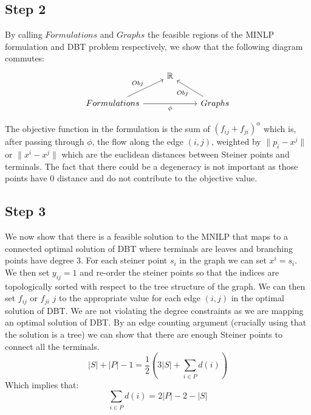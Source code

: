 \documentclass[11pt,reqno,a4paper]{amsart}
\numberwithin{equation}{section}
\theoremstyle{mytheorem}
\theoremstyle{myremark}
\theoremstyle{myparagraph}
\begin{document}
    \subsection{Step 2}
    By calling $Formulations$ and $Graphs$ the feasible regions of the MINLP formulation and DBT problem respectively, we show that the following diagram commutes:
    \[
        \begin{tikzcd}
            & \mathbb{R}  \\
            Formulations \arrow[ur, "Obj"] \arrow[rr, "\phi"'] & & Graphs  \arrow[ul, "Obj"]
        \end{tikzcd}
    \]

    The objective function in the formulation is the sum of $(f_{ij} + f_{ji})^\alpha$ which is, after passing through $\phi$, the flow
    along the edge $(i,j)$, weighted by $\| p_i - x^j \|$ or $\|x^i-x^j \|$ which are the euclidean distances between
    Steiner points and terminals.
    The fact that there could be a degeneracy is not important as those points have $0$ distance and do not contribute to the
    objective value.

    \subsection{Step 3}

    We now show that there is a feasible solution to the MNILP that maps to a connected optimal solution of DBT where terminals are
    leaves and branching points have degree 3.
    For each steiner point $s_i$ in the graph we can set $x^i = s_i$. We then set $y_{ij} = 1$ and re-order the steiner points
    so that the indices are topologically sorted with respect to the tree structure of the graph.
    We can then set $f_{ij}$ or $f_{ji}$ $j$ to the appropriate value for each edge $(i,j)$ in the optimal solution of DBT.
    We are not violating the degree constraints as we are mapping an optimal solution of DBT.
    By an edge counting argument (crucially using that the solution is a tree) we can show that there are enough Steiner points to connect all the terminals.
    \begin{equation}
        |S| + |P| - 1 = \frac{1}{2} \left( 3|S| + \sum_{i \in P} d(i) \right)
    \end{equation}
    Which implies that:
    \begin{equation}
        \label{eq:edge_counting}
        \sum_{i \in P} d(i) = 2|P| - 2 - |S|
    \end{equation}
\end{document}
